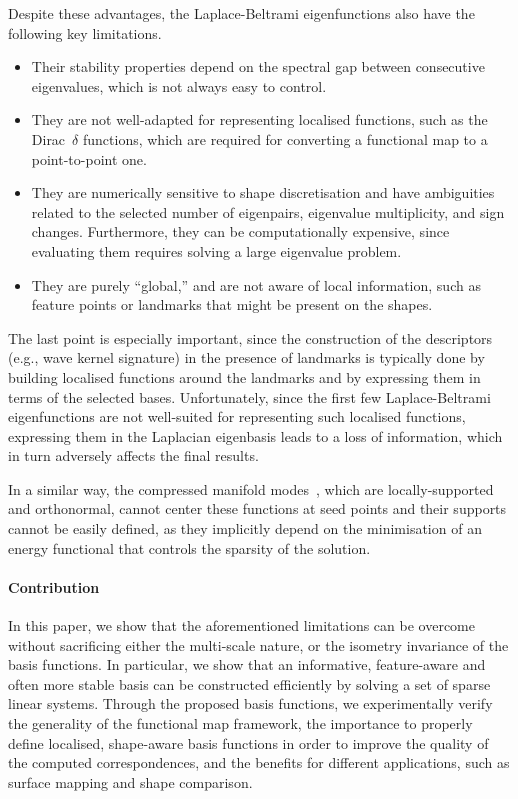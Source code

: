 \documentclass[acmtog,authorversion]{acmart}
\begin{document}
Despite these advantages, the Laplace-Beltrami eigenfunctions also have the following key limitations.
%
\begin{itemize}
\item Their stability properties depend on the spectral gap between consecutive eigenvalues, which is not always easy to control.
\item They are not well-adapted for representing localised functions, such as the Dirac~$\delta$ functions, which are required for converting a functional map to a point-to-point one.
\item They are numerically sensitive to shape discretisation and have ambiguities related to the selected number of eigenpairs, eigenvalue multiplicity, and sign changes. Furthermore, they can be computationally expensive, since evaluating them requires solving a large eigenvalue problem.
\item They are purely ``global,'' and are not aware of local information, such as feature points or landmarks that might be present on the shapes.
\end{itemize}
%
The last point is especially important, since the construction of the descriptors (e.g., wave kernel signature) in the presence of landmarks is typically done by building localised functions around the landmarks and by expressing them in terms of the selected bases. Unfortunately, since the first few Laplace-Beltrami eigenfunctions are not well-suited for representing such localised functions, expressing them in the Laplacian eigenbasis leads to a loss of information, which in turn adversely affects the final results.

In a similar way, the compressed manifold modes~\citep{BAREKAT2017,NEUMANN2014}, which are locally-supported and orthonormal, cannot center these functions at seed points and their supports cannot be easily defined, as they implicitly depend on the minimisation of an energy functional that controls the sparsity of the solution.

\paragraph*{Contribution}
 In this paper, we show that the aforementioned limitations can be overcome without sacrificing either the multi-scale nature, or the isometry invariance of the basis functions. In particular, we show that an informative, feature-aware and often more stable basis can be constructed efficiently by solving a set of sparse linear systems. Through the proposed basis functions, we experimentally verify the generality of the functional map framework, the importance to properly define localised, shape-aware basis functions in order to improve the quality of the computed correspondences, and the benefits for different applications, such as surface mapping and shape comparison.
 
\end{document}
